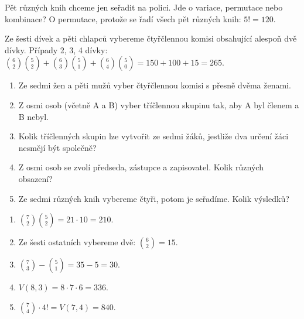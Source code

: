 \documentclass[11pt,a4paper]{article}
\begin{document}
\begin{zadaniReseniBox}[title={Samostatná práce 3}]
Pět různých knih chceme jen seřadit na polici. Jde o variace, permutace nebo kombinace?
\tcblower
O permutace, protože se řadí všech pět různých knih: $5!=120$.
\end{zadaniReseniBox}




\begin{zadaniReseniBox}[title={Rozšíření 1}]
Ze šesti dívek a pěti chlapců vybereme čtyřčlennou komisi obsahující alespoň dvě dívky.
\tcblower
Případy 2, 3, 4 dívky: $\binom62\binom52+\binom63\binom51+\binom64\binom50=150+100+15=265$.
\end{zadaniReseniBox}





\begin{zadaniReseniBox}[title={Domácí úkol}]

\begin{enumerate}[label=\alph*),leftmargin=*,itemsep=2pt]

\item Ze sedmi žen a pěti mužů vyber čtyřčlennou komisi s přesně dvěma ženami.
\item Z osmi osob (včetně A a B) vyber tříčlennou skupinu tak, aby A byl členem a B nebyl.
\item Kolik tříčlenných skupin lze vytvořit ze sedmi žáků, jestliže dva určení žáci nesmějí být společně?
\item Z osmi osob se zvolí předseda, zástupce a zapisovatel. Kolik různých obsazení?
\item Ze sedmi různých knih vybereme čtyři, potom je seřadíme. Kolik výsledků?

\end{enumerate}

\tcblower

\begin{enumerate}[label=\alph*),leftmargin=*,itemsep=2pt]

\item $\binom72\binom52=21\cdot10=210$.
\item Ze šesti ostatních vybereme dvě: $\binom62=15$.
\item $\binom73-\binom51=35-5=30$.
\item $V(8,3)=8\cdot7\cdot6=336$.
\item $\binom74\cdot4!=V(7,4)=840$.

\end{enumerate}

\end{zadaniReseniBox}


\end{document}
